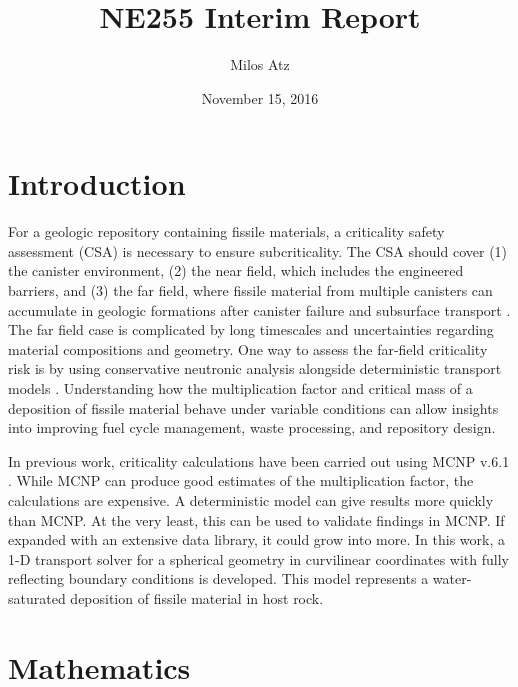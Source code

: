 \documentclass[11pt, oneside]{article}   	%
\title{NE255 Interim Report}
\author{Milos Atz}
\date{November 15, 2016}
\begin{document}
\maketitle

\section{Introduction}

For a geologic repository containing fissile materials, a criticality safety assessment (CSA) is necessary to ensure subcriticality. The CSA should cover (1) the canister environment, (2) the near field, which includes the engineered barriers, and (3) the far field, where fissile material from multiple canisters can accumulate in geologic formations after canister failure and subsurface transport \cite{ahn1}. The far field case is complicated by long timescales and uncertainties regarding material compositions and geometry. One way to assess the far-field criticality risk is by using conservative neutronic analysis alongside deterministic transport models \cite{ahn1}. Understanding how the multiplication factor and critical mass of a deposition of fissile material behave under variable conditions can allow insights into improving fuel cycle management, waste processing, and repository design.

In previous work, criticality calculations have been carried out using MCNP v.6.1 \cite{xudong} \cite{mcnp}. While MCNP can produce good estimates of the multiplication factor, the calculations are expensive. A deterministic model can give results more quickly than MCNP. At the very least, this can be used to validate findings in MCNP. If expanded with an extensive data library, it could grow into more. In this work, a 1-D transport solver for a spherical geometry in curvilinear coordinates with fully reflecting boundary conditions is developed. This model represents a water-saturated deposition of fissile material in host rock.


\section{Mathematics}
\end{document}
